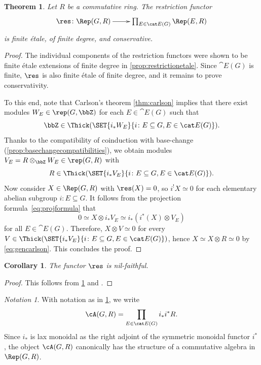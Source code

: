 \documentclass{amsart}%
\numberwithin{equation}{section}%
\newtheorem{Thm}[equation]{Theorem}
\newtheorem{Cor}[equation]{Corollary}
\theoremstyle{remark}
\newtheorem{Not}[equation]{Notation}
\begin{document}
\begin{Thm}\label{thm:derivedchouinard}
Let $R$ be a commutative ring. The restriction functor
\[
\xymatrix{\res\colon \Rep(G,R) \ar[r] & \prod_{E \in \cat E(G)}\Rep(E,R)}
\]
is finite \'etale, of finite degree, and conservative.
\end{Thm}
\begin{proof}
The individual components of the restriction functors were shown to be finite \'etale extensions of finite degree in \cref{prop:restrictionetale}. Since $\cat E(G)$ is finite, $\res$ is also finite \'etale of finite degree, and it remains to prove conservativity. 

To this end, note that Carlson's theorem \cref{thm:carlson} implies that there exist modules $W_E \in \rep(G,\bbZ)$ for each $E \in \cat E(G)$ such that
\[
\bbZ \in \Thick(\SET{i_*W_E}{i\colon E \subseteq G, E \in \cat E(G)}).
\]
Thanks to the compatibility of coinduction with base-change (\cref{prop:basechangecompatibilities}), we obtain modules $V_E = R\otimes_{\bbZ}W_E \in \rep(G,R)$ with 
\begin{equation}\label{eq:gencarlson}
    R \in \Thick(\SET{i_*V_E}{i\colon E \subseteq G, E \in \cat E(G)}).
\end{equation}
Now consider $X \in \Rep(G,R)$ with $\res(X) = 0$, so $i^!X \simeq 0$ for each elementary abelian subgroup $i\colon E \subseteq G$. It follows from the projection formula~\eqref{eq:projformula} that 
\[
0 \simeq X \otimes i_*V_E \simeq i_*(i^*(X)\otimes V_E)
\]
for all $E \in \cat E(G)$. Therefore, $X \otimes V \simeq 0$ for every $V \in \Thick(\SET{i_*V_E}{i\colon E \subseteq G, E \in \cat E(G)})$, hence $X \simeq X \otimes R \simeq 0$ by \cref{eq:gencarlson}. This concludes the proof.
\end{proof}

\begin{Cor}\label{cor:nilfaithful}
The functor $\res$ is nil-faithful. 
\end{Cor}
\begin{proof}
This follows from \cref{thm:derivedchouinard} and \cite[Prop.~3.15]{Balmer16b}. 
\end{proof}

\begin{Not}
With notation as in \cref{thm:derivedchouinard}, we write 
\begin{equation}\label{eq:descendableA}
    \cA(G,R) = \prod_{E \in \cat E(G)}i_*i^*R.    
\end{equation} 
Since $i_*$ is lax monoidal as the right adjoint of the symmetric monoidal functor $i^*$, the object $\cA(G,R)$ canonically has the structure of a commutative algebra in $\Rep(G,R)$.
\end{Not}
\end{document}
